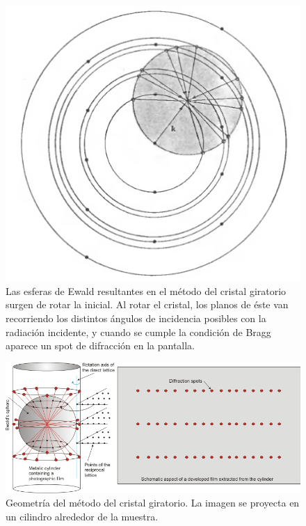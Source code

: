 \begin{figure}
  \centering
  \includegraphics[width=\textwidth]{figures/rotaewald.png}
  \caption{Las esferas de Ewald resultantes en el método del cristal giratorio
    surgen de rotar la inicial. Al rotar el cristal, los planos de éste van
    recorriendo los distintos ángulos de incidencia posibles con la radiación
    incidente, y cuando se cumple la condición de Bragg aparece un spot de
    difracción en la pantalla.}
  \label{fig:rotaewald}
\end{figure}

\begin{figure}
  \centering
  \includegraphics[width=\textwidth]{figures/rotageom.png}
  \caption{Geometría del método del cristal giratorio. La imagen se proyecta en
    un cilindro alrededor de la muestra.}
  \label{fig:rotageom}
\end{figure}



